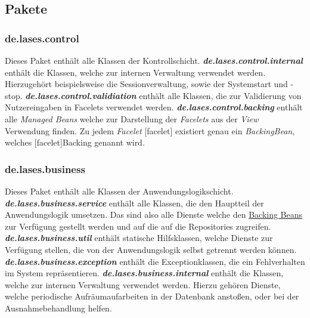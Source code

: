 \subsection{Pakete}\label{arch:pakete}

\subsubsection{de.lases.control} \label{arch:control}
Dieses Paket enthält alle Klassen der Kontrollschicht.
\newline\newline
\textbf{\emph{de.lases.control.internal}}
enthält die Klassen, welche zur internen Verwaltung verwendet werden.
Hierzugehört beispielsweise die Sessionverwaltung, sowie der Systemstart und -stop.
\newline\newline
\textbf{\emph{de.lases.control.validiation}}
enthält alle Klassen, die zur Validierung von Nutzereingaben
in Facelets verwendet werden.
\newline\newline
\textbf{\emph{de.lases.control.backing}}\label{arch:backing}
enthält alle \emph{Managed Beans} welche zur Darstellung der \emph{Facelets} aus der
\emph{View} Verwendung finden. Zu jedem \emph{Facelet} [facelet] existiert genau ein
\emph{Backing\-Bean}, welches [facelet]Backing genannt wird.

\subsubsection{de.lases.business}\label{arch:business}
Dieses Paket enthält alle Klassen der Anwendungslogikschicht.
\newline\newline
\textbf{\emph{de.lases.business.service}}\label{arch:service}
enthält alle Klassen, die den Hauptteil der Anwendungslogik umsetzen.
Das sind also alle Dienste welche den
\hyperref[arch:backing]{Backing Beans} zur Verfügung
gestellt werden und auf die auf die %
Repositories zugreifen.
\newline\newline
\textbf{\emph{de.lases.business.util}}
enthält statische Hilfsklassen, welche Dienste zur Verfügung stellen,
die von der Anwendungslogik selbst getrennt werden können.
\newline\newline
\textbf{\emph{de.lases.business.exception}} \label{arch:busex}
enthält die Exceptionklassen, die ein Fehlverhalten im System repräsentieren.
\newline\newline
\textbf{\emph{de.lases.business.internal}}
enthält die Klassen, welche zur internen Verwaltung verwendet werden.
Hierzu gehören Dienste, welche periodische Aufräumaufarbeiten in der Datenbank anstoßen,
oder bei der Ausnahmebehandlung helfen.

